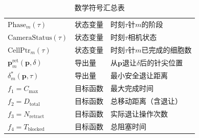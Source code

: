 \documentclass[11pt,a4paper]{article}
\begin{document}
\begin{table}[H]
\begin{tabular}{|l|l|p{8cm}|}
$\text{Phase}_m(\tau)$ & 状态变量 & 时刻$\tau$针$m$的阶段 \\
$\text{CameraStatus}(\tau)$ & 状态变量 & 时刻$\tau$相机状态 \\
$\text{CellPtr}_m(\tau)$ & 状态变量 & 时刻$\tau$针$m$已完成的细胞数 \\
\hline
$\mathbf{p}_m^{\text{ret}}(\mathbf{p}, \delta)$ & 导出量 & 从$\mathbf{p}$退让$\delta$后的针尖位置 \\
$\delta_m^*(\mathbf{p}, \tau)$ & 导出量 & 最小安全退让距离 \\
\hline
$f_1 = C_{\max}$ & 目标函数 & 最大完成时间 \\
$f_2 = D_{\text{total}}$ & 目标函数 & 总移动距离（含退让） \\
$f_3 = N_{\text{retract}}$ & 目标函数 & 实际退让操作次数 \\
$f_4 = T_{\text{blocked}}$ & 目标函数 & 总阻塞时间 \\
\hline
\end{tabular}
\caption{数学符号汇总表}
\end{table}
\end{document}
